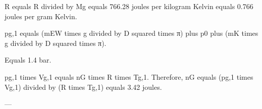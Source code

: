 R equals R divided by Mg equals 766.28 joules per kilogram Kelvin equals 0.766 joules per gram Kelvin.  

pg,1 equals (mEW times g divided by D squared times π) plus p0 plus (mK times g divided by D squared times π).  

Equals 1.4 bar.  

pg,1 times Vg,1 equals nG times R times Tg,1. Therefore, nG equals (pg,1 times Vg,1) divided by (R times Tg,1) equals 3.42 joules.  

---